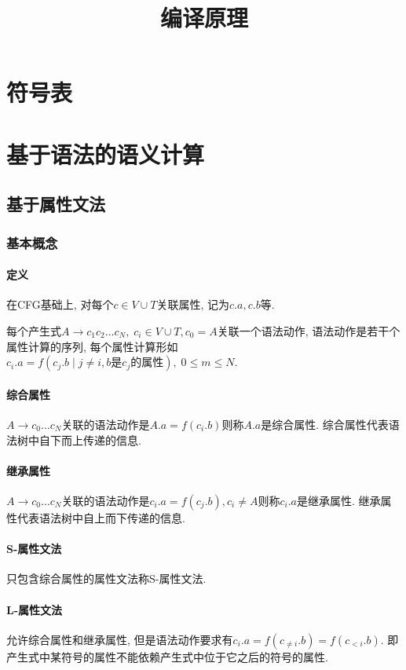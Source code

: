 \documentclass{ctexart}
\title{编译原理}
\begin{document}
\maketitle

\tableofcontents

\section{符号表}

\section{基于语法的语义计算}
\subsection{基于属性文法}
\subsubsection{基本概念}
\paragraph{定义}
    在CFG基础上, 对每个$c \in V \cup T$关联属性, 记为$c.a, c.b$等.\par
    每个产生式$A\to c_1 c_2 \ldots c_N,\; c_i \in V \cup T, c_0 = A$关联一个语法动作,
    语法动作是若干个属性计算的序列, 每个属性计算形如$c_i.a = f(c_j.b \;|\; j \neq i, b\text{是}c_j\text{的属性}),\; 0 \le m \le N$.
\paragraph{综合属性} $A \to c_0 \ldots c_N$关联的语法动作是$A.a = f(c_i.b)$则称$A.a$是综合属性.
    综合属性代表语法树中自下而上传递的信息.
\paragraph{继承属性} $A \to c_0 \ldots c_N$关联的语法动作是$c_i.a = f(c_j.b),c_i \neq A$则称$c_i.a$是继承属性.
    继承属性代表语法树中自上而下传递的信息.
\paragraph{S-属性文法} 只包含综合属性的属性文法称S-属性文法.
\paragraph{L-属性文法} 允许综合属性和继承属性, 但是语法动作要求有$c_i.a = f(c_{\neq i}.b) =f(c_{< i}.b)$.
    即产生式中某符号的属性不能依赖产生式中位于它之后的符号的属性.
\end{document}

